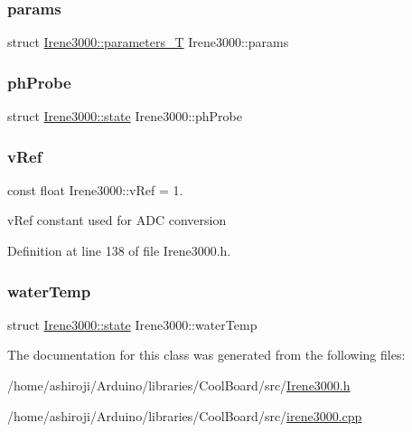 \subsubsection{\texorpdfstring{params}{params}}
{\footnotesize\ttfamily struct \hyperlink{struct_irene3000_1_1parameters___t}{Irene3000\+::parameters\+\_\+T} Irene3000\+::params\hspace{0.3cm}{\ttfamily [private]}}

\mbox{\label{class_irene3000_a997a4ee466fa1d5416e07e444965dc9e}} 
\subsubsection{\texorpdfstring{ph\+Probe}{phProbe}}
{\footnotesize\ttfamily struct \hyperlink{struct_irene3000_1_1state}{Irene3000\+::state}  Irene3000\+::ph\+Probe\hspace{0.3cm}{\ttfamily [private]}}

\mbox{\label{class_irene3000_a018e7ff9bee57e6d2b298667a668ba7e}} 
\subsubsection{\texorpdfstring{v\+Ref}{vRef}}
{\footnotesize\ttfamily const float Irene3000\+::v\+Ref = 1.\hspace{0.3cm}{\ttfamily [private]}}

v\+Ref constant used for A\+DC conversion 

Definition at line 138 of file Irene3000.\+h.

\mbox{\label{class_irene3000_af05612c78c758ce9db316c75ad937130}} 
\subsubsection{\texorpdfstring{water\+Temp}{waterTemp}}
{\footnotesize\ttfamily struct \hyperlink{struct_irene3000_1_1state}{Irene3000\+::state}  Irene3000\+::water\+Temp\hspace{0.3cm}{\ttfamily [private]}}



The documentation for this class was generated from the following files\+:\begin{DoxyCompactItemize}
\item 
/home/ashiroji/\+Arduino/libraries/\+Cool\+Board/src/\hyperlink{_irene3000_8h}{Irene3000.\+h}\item 
/home/ashiroji/\+Arduino/libraries/\+Cool\+Board/src/\hyperlink{irene3000_8cpp}{irene3000.\+cpp}\end{DoxyCompactItemize}
